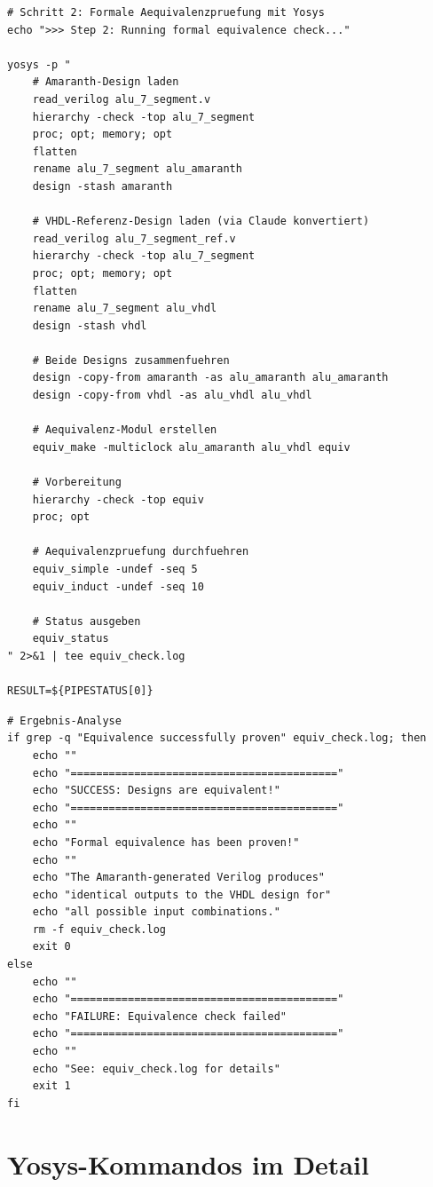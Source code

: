 ﻿\documentclass[12pt,a4paper]{report}
\begin{document}
\begin{lstlisting}[style=bashstyle, caption={Verifikations-Script - Teil 2}]
# Schritt 2: Formale Aequivalenzpruefung mit Yosys
echo ">>> Step 2: Running formal equivalence check..."

yosys -p "
    # Amaranth-Design laden
    read_verilog alu_7_segment.v
    hierarchy -check -top alu_7_segment
    proc; opt; memory; opt
    flatten
    rename alu_7_segment alu_amaranth
    design -stash amaranth
    
    # VHDL-Referenz-Design laden (via Claude konvertiert)
    read_verilog alu_7_segment_ref.v
    hierarchy -check -top alu_7_segment
    proc; opt; memory; opt
    flatten
    rename alu_7_segment alu_vhdl
    design -stash vhdl
    
    # Beide Designs zusammenfuehren
    design -copy-from amaranth -as alu_amaranth alu_amaranth
    design -copy-from vhdl -as alu_vhdl alu_vhdl
    
    # Aequivalenz-Modul erstellen
    equiv_make -multiclock alu_amaranth alu_vhdl equiv
    
    # Vorbereitung
    hierarchy -check -top equiv
    proc; opt
    
    # Aequivalenzpruefung durchfuehren
    equiv_simple -undef -seq 5
    equiv_induct -undef -seq 10
    
    # Status ausgeben
    equiv_status
" 2>&1 | tee equiv_check.log

RESULT=${PIPESTATUS[0]}
\end{lstlisting}

\begin{lstlisting}[style=bashstyle, caption={Verifikations-Script - Teil 3}]
# Ergebnis-Analyse
if grep -q "Equivalence successfully proven" equiv_check.log; then
    echo ""
    echo "=========================================="
    echo "SUCCESS: Designs are equivalent!"
    echo "=========================================="
    echo ""
    echo "Formal equivalence has been proven!"
    echo ""
    echo "The Amaranth-generated Verilog produces"
    echo "identical outputs to the VHDL design for"
    echo "all possible input combinations."
    rm -f equiv_check.log
    exit 0
else
    echo ""
    echo "=========================================="
    echo "FAILURE: Equivalence check failed"
    echo "=========================================="
    echo ""
    echo "See: equiv_check.log for details"
    exit 1
fi
\end{lstlisting}

\section{Yosys-Kommandos im Detail}
\end{document}
